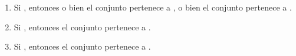 \begin{isabellebody}
\begin{isamarkuptext}
\begin{definicion}
\begin{enumerate}
      \item Si , entonces o bien el conjunto  pertenece a , o bien el 
        conjunto  pertenece a .
      \item Si , entonces el conjunto  pertenece a .
      \item Si , entonces el conjunto  pertenece a .
    \end{enumerate}
  \end{definicion}


\end{isamarkuptext}
\end{isabellebody}
